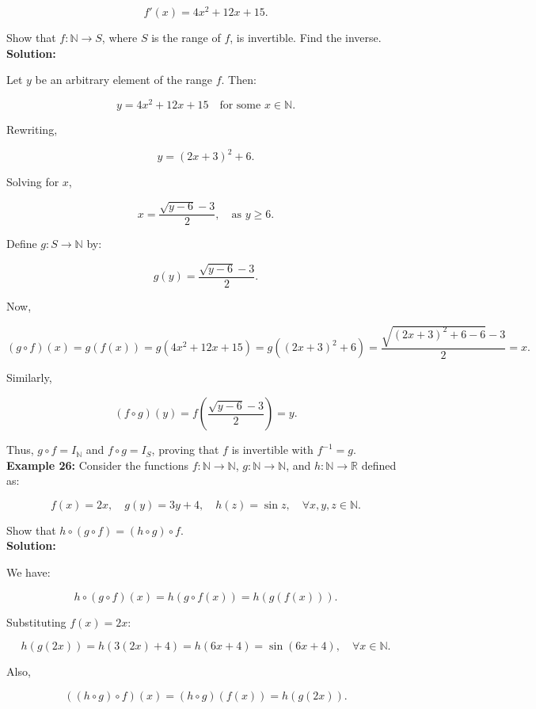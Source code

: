 \documentclass[12pt]{article}
\begin{document}
\[
f'(x) = 4x^2 + 12x + 15.
\]

Show that \( f: \mathbb{N} \to S \), where \( S \) is the range of \( f \), is invertible. Find the inverse.\\

\textbf{Solution:}  

Let \( y \) be an arbitrary element of the range \( f \). Then:

\[
y = 4x^2 + 12x + 15 \quad \text{for some } x \in \mathbb{N}.
\]

Rewriting,

\[
y = (2x + 3)^2 + 6.
\]

Solving for \( x \),

\[
x = \frac{\sqrt{y - 6} - 3}{2}, \quad \text{as } y \geq 6.
\]

Define \( g: S \to \mathbb{N} \) by:

\[
g(y) = \frac{\sqrt{y - 6} - 3}{2}.
\]

Now,

\[
(g \circ f)(x) = g(f(x)) = g(4x^2 + 12x + 15) = g((2x + 3)^2 + 6) = \frac{\sqrt{(2x+3)^2 + 6 - 6} - 3}{2} = x.
\]

Similarly,

\[
(f \circ g)(y) = f\left(\frac{\sqrt{y - 6} - 3}{2}\right) = y.
\]

Thus, \( g \circ f = I_{\mathbb{N}} \) and \( f \circ g = I_S \), proving that \( f \) is invertible with \( f^{-1} = g \).\\

\textbf{Example 26:}  
Consider the functions \( f: \mathbb{N} \to \mathbb{N} \), \( g: \mathbb{N} \to \mathbb{N} \), and \( h: \mathbb{N} \to \mathbb{R} \) defined as:

\[
f(x) = 2x, \quad g(y) = 3y + 4, \quad h(z) = \sin z, \quad \forall x, y, z \in \mathbb{N}.
\]

Show that \( h \circ ( g \circ f ) = (h \circ g) \circ f \).\\

\textbf{Solution:}  

We have:

\[
h \circ ( g \circ f )(x) = h( g \circ f (x)) = h(g(f(x))).
\]

Substituting \( f(x) = 2x \):

\[
h(g(2x)) = h(3(2x) + 4) = h(6x + 4) = \sin(6x + 4), \quad \forall x \in \mathbb{N}.
\]

Also,

\[
((h \circ g) \circ f) (x) = (h \circ g)(f(x)) = h(g(2x)).
\]
\end{document}
